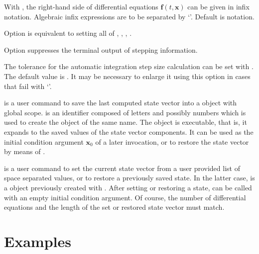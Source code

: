 \documentclass[11pt,english,BCOR10mm,DIV12,bibliography=totoc,parskip=false,smallheadings
    headexclude,footexclude,oneside,dvips]{pst-doc}
\begin{document}
With , the right-hand side of differential equations $\mathbf{f}(t,\mathbf{x})$ can be given in infix notation. Algebraic infix expressions are to be separated by `\Lkeyword{|}'. Default is \PS{} notation.

Option  is equivalent to setting all of , , , .

Option  suppresses the terminal output of stepping information.

The tolerance for the automatic integration step size calculation can be set with  \Lkeyword{=}. The default value is . It may be necessary to enlarge it using this option in cases that fail with `'.\\[1ex]

\begin{BDef}
\end{BDef}
is a user command to save the last computed state vector into a \PS{} object with global scope.  is an identifier composed of letters and possibly numbers which is used to create the \PS{} object of the same name. The object is executable, that is, it expands to the saved values of the state vector components. It can be used as the initial condition argument $\mathbf{x}_0$ of a later  invocation, or to restore the state vector by means of .\\[1ex] 

\begin{BDef}
\end{BDef}
is a user command to set the current state vector from a user provided list of space separated values, or to restore a previously saved state. In the latter case,  is a \PS{} object previously created with . After setting or restoring a state,  can be called with an empty initial condition argument. Of course, the number of differential equations and the length of the set or restored state vector must match.

\section{Examples}
\end{document}
